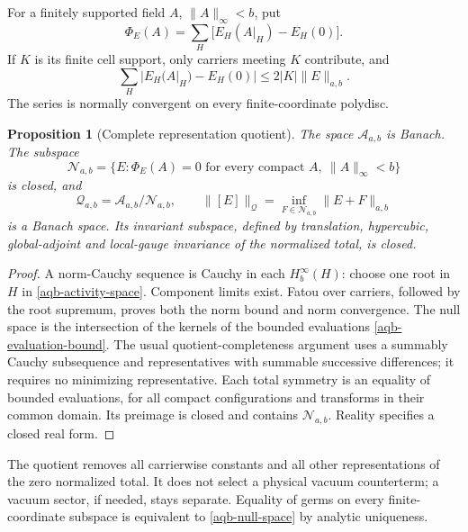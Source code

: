 \documentclass[11pt]{article}
\newtheorem{proposition}[theorem]{Proposition}
\theoremstyle{remark}
\begin{document}
For a finitely supported field $A$, $\|A\|_\infty<b$, put
\begin{equation}
 \Phi_E(A)=\sum_H\bigl[E_H(A|_H)-E_H(0)\bigr].
 \label{aqb-total}
\end{equation}
If $K$ is its finite cell support, only carriers meeting $K$
contribute, and
\begin{equation}
 \sum_H|E_H(A|_H)-E_H(0)|\le2|K|\|E\|_{a,b}.
 \label{aqb-evaluation-bound}
\end{equation}
The series is normally convergent on every finite-coordinate
polydisc.

\begin{proposition}[Complete representation quotient]
\label{aqb-quotient-proposition}
The space $\mathcal A_{a,b}$ is Banach. The subspace
\begin{equation}
 \mathcal N_{a,b}=\{E:\Phi_E(A)=0
                  \text{ for every compact }A,\ \|A\|_\infty<b\}
 \label{aqb-null-space}
\end{equation}
is closed, and
\begin{equation}
 \mathcal Q_{a,b}=\mathcal A_{a,b}/\mathcal N_{a,b},
 \qquad
 \|[E]\|_{\mathcal Q}=\inf_{F\in\mathcal N_{a,b}}
                                      \|E+F\|_{a,b}
 \label{aqb-quotient-norm}
\end{equation}
is a Banach space. Its invariant subspace, defined by translation,
hypercubic, global-adjoint and local-gauge invariance of the
normalized total, is closed.
\end{proposition}

\begin{proof}
A norm-Cauchy sequence is Cauchy in each $H^\infty_b(H)$:
choose one root in $H$ in \eqref{aqb-activity-space}. Component
limits exist. Fatou over carriers, followed by the root supremum,
proves both the norm bound and norm convergence. The null space
is the intersection of the kernels of the bounded evaluations
\eqref{aqb-evaluation-bound}. The usual quotient-completeness
argument uses a summably Cauchy subsequence and representatives
with summable successive differences; it requires no minimizing
representative. Each total symmetry is an equality of bounded
evaluations, for all compact configurations and transforms in
their common domain. Its preimage is closed and contains
$\mathcal N_{a,b}$. Reality specifies a closed real form.
\end{proof}

The quotient removes all carrierwise constants and all other
representations of the zero normalized total. It does not select
a physical vacuum counterterm; a vacuum sector, if needed, stays
separate. Equality of germs on every finite-coordinate subspace
is equivalent to \eqref{aqb-null-space} by analytic uniqueness.
\end{document}
